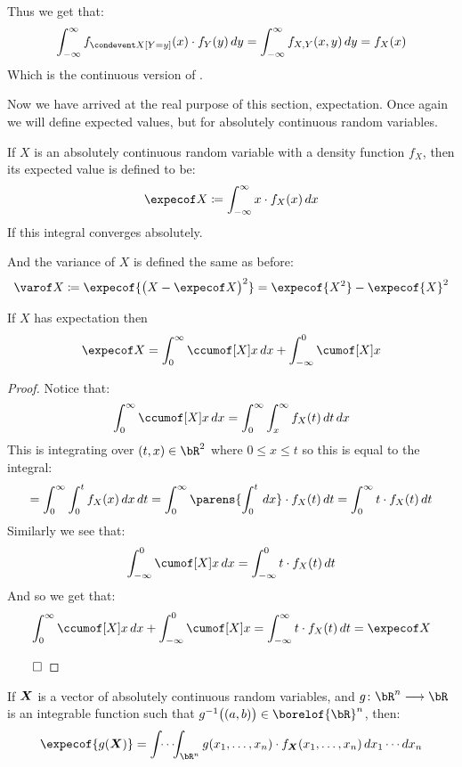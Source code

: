 Thus we get that:
\[ \int_{-\infty}^\infty f_{\condevent X[Y=y]}(x)\cdot f_{Y}(y)\,dy = \int_{-\infty}^\infty f_{X,Y}(x,y)\,dy = f_X(x) \]
Which is the continuous version of .

Now we have arrived at the real purpose of this section, expectation.
Once again we will define expected values, but for absolutely continuous random variables.

\begin{defn*}

	If $X$ is an absolutely continuous random variable with a density function $f_X$, then its expected value is
	defined to be:
	\[ \expecof X\coloneqq\int_{-\infty}^\infty x\cdot f_X(x)\,dx \]
	If this integral converges absolutely.

	And the variance of $X$ is defined the same as before:
	\[ \varof X\coloneqq\expecof{\big(X-\expecof X\big)^2} = \expecof{X^2}-\expecof{X}^2 \]

\end{defn*}

\begin{prop*}

	If $X$ has expectation then
	\[ \expecof X = \int_0^\infty \ccumof[X]x\,dx + \int_{-\infty}^0 \cumof[X]x \]

\end{prop*}

\begin{proof}

	Notice that:
	\[ \int_0^\infty\ccumof[X]x\,dx = \int_0^\infty\int_x^\infty f_X(t)\,dt\,dx \]
	This is integrating over $(t,x)\in\bR^2$ where $0\leq x\leq t$ so this is equal to the integral:
	\[ = \int_0^\infty \int_0^t f_X(x)\,dx\,dt = \int_0^\infty \parens{\int_0^t\,dx}\cdot f_X(t)\,dt = \int_0^\infty t\cdot f_X(t)\,dt \]
	Similarly we see that:
	\[ \int_{-\infty}^0\cumof[X]x\,dx = \int_{-\infty}^0 t\cdot f_X(t)\,dt \]
	And so we get that:
	\[ \int_0^\infty \ccumof[X]x\,dx + \int_{-\infty}^0 \cumof[X]x = \int_{-\infty}^\infty t\cdot f_X(t)\,dt = \expecof X \]

	\hfill$\qed$

\end{proof}


\begin{thrm*}

	If $\boldsymbol{X}$ is a vector of absolutely continuous random variables, and $g\colon\bR^n\longrightarrow\bR$ is an integrable function such that
	$g^{-1}\big((a,b)\big)\in\borelof{\bR}^n$, then:
	\[ \expecof{g(\jpv)} = \int\!\!\cdots\!\!\int_{\bR^n}g(x_1,\dots,x_n)\cdot f_{\jpv}(x_1,\dots,x_n)\,dx_1\cdots dx_n \]

\end{thrm*}


